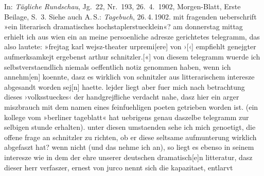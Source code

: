 \begin{ledgroupsized}[t]{13cm}
{{{                     In: \emph{Tägliche Rundschau}, Jg. 22, Nr. 193,
                        26. 4. 1902, Morgen-Blatt, Erste Beilage,
                     S. 3. Siehe auch A. S.: \emph{Tagebuch}, 26. 4. 1902.}}}\label{K_L02634-1h} mit fragenden ueberschrift »ein literarisch dramatisches
               hochstaplerstuecklein«? am donnerstag{ }mittag erhielt ich aus wien ein an
               meine persoenliche adresze gerichtetes telegramm, das also lautete: »frejtag{ }karl wejsz-theater
                  urpremi{[}ere{]} von ›\label{K_L02634-2v}\label{K_L02634-2h}{[}‹{]} empfiehlt genejgter aufmerksamkejt ergebenst arthur
                  schnitzler.{[}«{]} von diesem telegramm wuerde ich
               selbstverstaendlich niemals oeffentlich notiz genommen haben, wenn ich
                  annehm{[}en{]} koennte, dasz es wirklich von schnitzler aus {\pb}litterarischem interesze abgesandt worden
                  sej{[}n{]} haette. lejder liegt aber fuer mich nach betrachtung
               dieses ›volksstueckes‹ der
               handgrejfliche verdacht nahe, dasz hier ein arger miszbrauch mit dem namen eines
               feinfuehligen poeten getrieben worden ist. (ein kollege vom »berliner tageblatt« hat uebrigens genau daszelbe telegramm
               zur selbigen stunde erhalten). unter diesen umstaenden sehe ich mich
               genoetigt, die offene frage an schnitzler zu richten, ob er diese seltsame
               aufmunterung wirklich abgefaszt hat? wenn nicht (und das nehme ich an), so liegt es
               ebenso in seinem interesze wie in dem der ehre unserer deutschen
                  dramatisch{[}e{]}n litteratur, dasz dieser herr verfaszer, ernest von jurco nennt sich die kapazitaet, entlarvt

\end{ledgroupsized}
